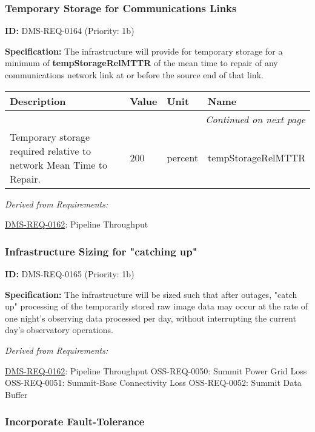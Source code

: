 \documentclass[SE,toc,lsstdraft]{lsstdoc}
\makeatletter
\newcommand{\paramname}[1]{\hspace{0pt}#1}
\newcommand{\unitname}[1]{\hspace{0pt}#1}
\newenvironment{parameters}[0]{%
\setlength\LTleft{0pt}
\setlength\LTright{\fill}
\begin{small}
\begin{longtable}[]{|p{0.49\textwidth}|l|p{0.6in}|p{1.70in}@{}|}

\hline \textbf{Description} & \textbf{Value} & \textbf{Unit} & \textbf{Name} \\ \hline
\endhead

\hline \multicolumn{4}{r}{\emph{Continued on next page}} \\
\endfoot

\hline\hline
\endlastfoot
}{%
\hline
\end{longtable}
\end{small}
}
\makeatother
\begin{document}
\subsubsection{Temporary Storage for Communications Links}

\label{DMS-REQ-0164}
\textbf{ID:} DMS-REQ-0164 (Priority: 1b)

    \textbf{Specification: }The infrastructure will provide for temporary storage for a minimum of \textbf{tempStorageRelMTTR} of the mean time to repair of any communications network link at or before the source end of that link.

\begin{parameters}
Temporary storage required relative to network Mean Time to Repair.
&
200
&
\unitname{%
percent
}
&
\paramname{%
tempStorageRelMTTR
} \\\hline
\end{parameters}

\emph{Derived from Requirements:}

\hyperref[DMS-REQ-0162]{DMS-REQ-0162}:
Pipeline Throughput \newline

\subsubsection{Infrastructure Sizing for "catching up"}

\label{DMS-REQ-0165}
\textbf{ID:} DMS-REQ-0165 (Priority: 1b)

    \textbf{Specification: }The infrastructure will be sized such that after outages, "catch up" processing of the temporarily stored raw image data may occur at the rate of one night’s observing data processed per day, without interrupting the current day's observatory operations.

\emph{Derived from Requirements:}

\hyperref[DMS-REQ-0162]{DMS-REQ-0162}:
Pipeline Throughput \newline
OSS-REQ-0050:
Summit Power Grid Loss \newline
OSS-REQ-0051:
Summit-Base Connectivity Loss \newline
OSS-REQ-0052:
Summit Data Buffer \newline

\subsubsection{Incorporate Fault-Tolerance}
\end{document}
